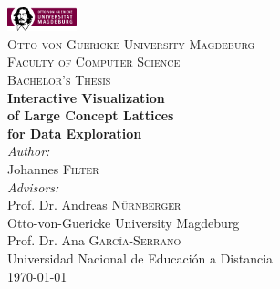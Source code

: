 \begin{titlepage}

\newcommand{\HRule}{\rule{\linewidth}{0.5mm}} %

\center %
 
\includegraphics[width=0.15\textwidth]{./logo}\\[1cm]

\textsc{\LARGE Otto-von-Guericke University Magdeburg}\\[0.5cm] %
\textsc{\large Faculty of Computer Science}\\[1.0cm] %
\textsc{\Large Bachelor's Thesis}\\[1.7cm] %

{ \huge \bfseries Interactive Visualization}\\[0.35cm]
{ \huge \bfseries of Large Concept Lattices}\\[0.2cm]
{ \huge \bfseries for Data Exploration}\\[1.5cm]
 

\Large \emph{Author:}\\
Johannes \textsc{Filter}\\[0.5cm]

\Large \emph{Advisors:}\\
Prof. Dr. Andreas \textsc{Nürnberger}\\
{\small Otto-von-Guericke University Magdeburg}\\[0.5cm]

Prof. Dr. Ana \textsc{García-Serrano}\\
{\small Universidad Nacional de Educación a Distancia}\\[1.0cm]


{\large \today}

\vfill %

\end{titlepage}
